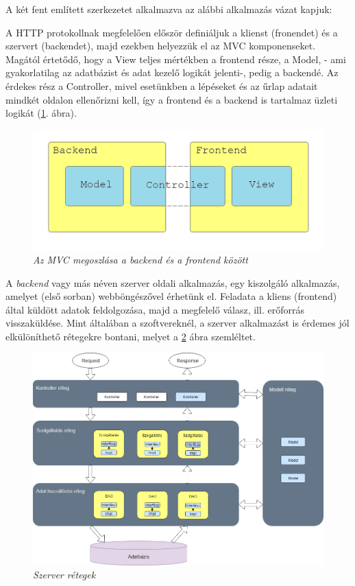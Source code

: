 
A két fent említett szerkezetet alkalmazva az alábbi alkalmazás vázat kapjuk:

A HTTP protokollnak megfelelően először definiáljuk a klienst (fronendet) és a szervert (backendet), majd ezekben helyezzük el az MVC komponenseket. Magától értetődő, hogy a View teljes mértékben a frontend része, a Model, - ami gyakorlatilag az adatbázist és adat kezelő logikát jelenti-, pedig a backendé. Az érdekes rész a Controller, mivel esetünkben a lépéseket és az űrlap adatait mindkét oldalon ellenőrizni kell, így a frontend és a backend is tartalmaz üzleti logikát (\ref{fig:mixed-arch}. ábra).
\begin{figure}[!h]
	\centering
	\includegraphics[width=0.5\linewidth]{kepek/mixed-arch.png}
	\caption{\textit{Az MVC megoszlása a backend és a frontend között}}
	\label{fig:mixed-arch}
\end{figure}



A \textit{backend} vagy más néven szerver oldali alkalmazás, egy kiszolgáló alkalmazás, amelyet (első sorban) webböngészővel érhetünk el. Feladata a kliens (frontend) által küldött adatok feldolgozása, majd a megfelelő válasz, ill. erőforrás visszaküldése. Mint általában a szoftvereknél, a szerver alkalmazást is érdemes jól elkülöníthető rétegekre bontani, melyet a \ref{fig:server-layers} ábra szemléltet.

\begin{figure}[!h]
	\centering
	\includegraphics[width=0.9\linewidth]{kepek/server-layers-colored.png}
	\caption{\textit{Szerver rétegek}}
	\label{fig:server-layers}
\end{figure}


